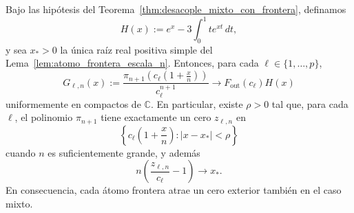 \begin{thm}\label{thm:frontera_mixta_completa}
	Bajo las hipótesis del Teorema~\ref{thm:desacople_mixto_con_frontera}, definamos
	\[
		H(x):=e^x-3\int_0^1 t e^{xt}\,dt,
	\]
	y sea $x_*>0$ la única raíz real positiva simple del Lema~\ref{lem:atomo_frontera_escala_n}. Entonces, para cada $\ell\in\{1,\dots,p\}$,
	\[
		G_{\ell,n}(x):=\frac{\pi_{n+1}\!\left(c_\ell\left(1+\frac{x}{n}\right)\right)}{c_\ell^{n+1}}
		\longrightarrow
		F_{\mathrm{out}}(c_\ell)H(x)
	\]
	uniformemente en compactos de $\mathbb C$. En particular, existe $\rho>0$ tal que, para cada $\ell$, el polinomio $\pi_{n+1}$ tiene exactamente un cero $z_{\ell,n}$ en
	\[
		\left\{c_\ell\left(1+\frac{x}{n}\right):|x-x_*|<\rho\right\}
	\]
	cuando $n$ es suficientemente grande, y además
	\[
		n\left(\frac{z_{\ell,n}}{c_\ell}-1\right)\longrightarrow x_*.
	\]
	En consecuencia, cada átomo frontera atrae un cero exterior también en el caso mixto.
\end{thm}

